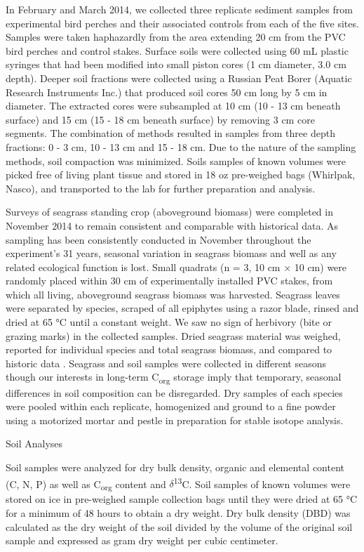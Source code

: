 In February and March 2014, we collected three replicate sediment samples from experimental bird perches and their associated controls from each of the five sites. Samples were taken haphazardly from the area extending 20 cm from the PVC bird perches and control stakes. Surface soils were collected using 60 mL plastic syringes that had been modified into small piston cores (1 cm diameter, 3.0 cm depth). Deeper soil fractions were collected using a Russian Peat Borer (Aquatic Research Instruments Inc.) that produced soil cores 50 cm long by 5 cm in diameter. The extracted cores were subsampled at 10 cm (10 - 13 cm beneath surface) and 15 cm (15 - 18 cm beneath surface) by removing 3 cm core segments. The combination of methods resulted in samples from three depth fractions: 0 - 3 cm, 10 - 13 cm and 15 - 18 cm. Due to the nature of the sampling methods, soil compaction was minimized. Soils samples of known volumes were picked free of living plant tissue and stored in 18 oz pre-weighed bags (Whirlpak, Nasco), and transported to the lab for further preparation and analysis.

Surveys of seagrass standing crop (aboveground biomass) were completed in November 2014 to remain consistent and comparable with historical data. As sampling has been consistently conducted in November throughout the experiment’s 31 years, seasonal variation in seagrass biomass and well as any related ecological function is lost. Small quadrats (n = 3, 10 cm × 10 cm) were randomly placed within 30 cm of experimentally installed PVC stakes, from which all living, aboveground seagrass biomass was harvested. Seagrass leaves were separated by species, scraped of all epiphytes using a razor blade, rinsed and dried at 65 °C until a constant weight. We saw no sign of herbivory (bite or grazing marks) in the collected samples. Dried seagrass material was weighed, reported for individual species and total seagrass biomass, and compared to historic data \citep{Powell:1989tt, Powell:1991va, Fourqurean:1995uj, Herbert:2008di}. Seagrass and soil samples were collected in different seasons though our interests in long-term C\textsubscript{org} storage imply that temporary, seasonal differences in soil composition can be disregarded. Dry samples of each species were pooled within each replicate, homogenized and ground to a fine powder using a motorized mortar and pestle in preparation for stable isotope analysis.

\bigskip
\noindent Soil Analyses
\medskip


Soil samples were analyzed for dry bulk density, organic and elemental content (C, N, P) as well as C\textsubscript{org} content and $\delta$\textsuperscript{13}C. Soil samples of known volumes were stored on ice in pre-weighed sample collection bags until they were dried at 65 °C for a minimum of 48 hours to obtain a dry weight. Dry bulk density (DBD) was calculated as the dry weight of the soil divided by the volume of the original soil sample and expressed as gram dry weight per cubic centimeter.

